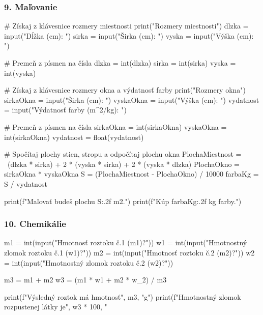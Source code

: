 \subsubsection*{9. Maľovanie}
\begin{solution}
# Získaj z klávesnice rozmery miestnosti
print("Rozmery miestnosti")
dlzka = input("Dĺžka (cm): ")
sirka = input("Širka (cm): ")
vyska = input("Výška (cm): ")

# Premeň z písmen na čísla
dlzka = int(dlzka)
sirka = int(sirka)
vyska = int(vyska)

# Získaj z klávesnice rozmery okna a výdatnosť farby
print("Rozmery okna")
sirkaOkna = input("Širka (cm): ")
vyskaOkna = input("Výška (cm): ")
vydatnost = input("Výdatnosť farby (m^2/kg): ")

# Premeň z písmen na čísla
sirkaOkna = int(sirkaOkna)
vyskaOkna = int(sirkaOkna)
vydatnost = float(vydatnost)

# Spočítaj plochy stien, stropu a odpočítaj plochu okna
PlochaMiestnost = \
(dlzka * sirka) + 2 * (vyska * sirka) + 2 * (vyska * dlzka)
PlochaOkno = sirkaOkna * vyskaOkna
S = (PlochaMiestnost - PlochaOkno) / 10000
farbaKg = S / vydatnost

print(f"Maľovať budeš plochu {S:.2f} m2.")
print(f"Kúp {farbaKg:.2f} kg farby.")
\end{solution}

\subsubsection*{10. Chemikálie}
\begin{solution}
m1 = int(input("Hmotnosť roztoku č.1 (m1)?"))
w1 = int(input("Hmotnostný zlomok roztoku č.1 (w1)?"))
m2 = int(input("Hmotnosť roztoku č.2 (m2)?"))
w2 = int(input("Hmotnostný zlomok roztoku č.2 (w2)?"))

m3 = m1 + m2
w3 = (m1 * w1 + m2 * w_2) / m3

print(f"Výsledný roztok má hmotnosť", m3, "g")
print(f"Hmotnostný zlomok rozpustenej látky je", w3 * 100, "%
\end{solution}

